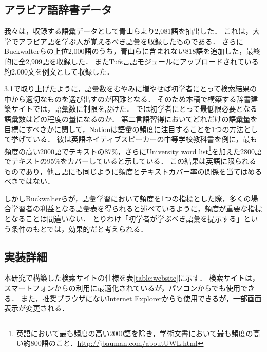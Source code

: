 \documentclass[technicalreport]{ieicej}
\begin{document}
\subsection{アラビア語辞書データ}
我々は，収録する語彙データとして青山ら\cite{aoyama2015}より2,081語を抽出した．
これは，大学でアラビア語を学ぶ人が覚えるべき語彙を収録したものである．
さらにBuckwalterら\cite{buckwalter2009}の上位2,000語のうち，青山ら\cite{aoyama2015}に含まれない818語を追加した，最終的に全2,909語を収録した．
またTufs言語モジュール\cite{kawaguchi2007}にアップロードされている約2,000文を例文として収録した．

3.1で取り上げたように，語彙数をむやみに増やせば初学者にとって検索結果の中から適切なものを選び出すのが困難となる．
そのため本稿で構築する辞書建築サイトでは，語彙数に制限を設けた．
では初学者にとって最低限必要となる語彙数はどの程度の量になるのか．
第二言語習得においてどれだけの語彙量を目標にすべきかに関して，Nation\cite{nation1990}は語彙の頻度に注目することを1つの方法として挙げている．
彼は英語ネイティブスピーカーの中等学校教科書を例に，最も頻度の高い2000語でテキストの87\%，さらにUniversity word list\footnote{英語において最も頻度の高い2000語を除き，学術文書において最も頻度の高い約800語のこと．\url{http://jbauman.com/aboutUWL.html}}を加えた2800語でテキストの95\%をカバーしていると示している．
この結果は英語に限られるものであり，他言語にも同じように頻度とテキストカバー率の関係を当てはめるべきではない．

しかしBuckwalterら\cite{buckwalter2009}が，語彙学習において頻度を1つの指標とした際，多くの場合学習者の利益となる語彙表を得られると述べているように，頻度が重要な指標となることは間違いない．
とりわけ「初学者が学ぶべき語彙を提示する」という条件のもとでは，効果的だと考えられる．

\subsection{実装詳細}
本研究で構築した検索サイトの仕様を表\ref{table:website}に示す．
検索サイトは，スマートフォンからの利用に最適化されているが，パソコンからでも使用できる．
また，推奨ブラウザにないInternet Explorerからも使用できるが，一部画面表示が変更される．
\end{document}
